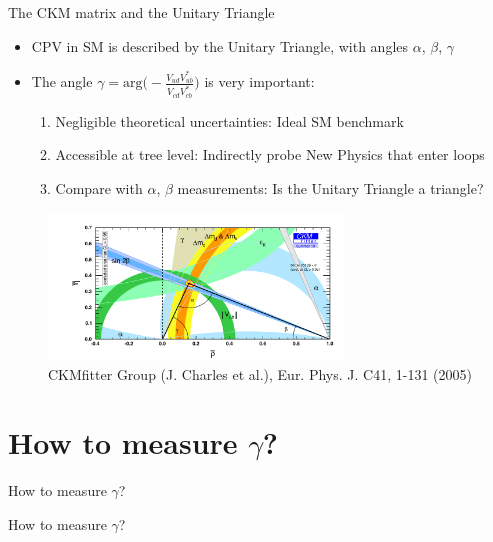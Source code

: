 \documentclass{beamer}
\begin{document}
\begin{frame}{The CKM matrix and the Unitary Triangle}
  \begin{itemize}
    \setlength\itemsep{0.3em}
    \item{CPV in SM is described by the Unitary Triangle, with angles $\alpha$, $\beta$, $\gamma$}
    \item{The angle $\gamma = \text{arg}\Big(-\frac{V^{\phantom{*}}_{ud}V^*_{ub}}{V^{\phantom{*}}_{cd}V^*_{cb}}\Big)$ is very important:}
    \begin{enumerate}
    \setlength\itemsep{0.2em}
      \item{Negligible theoretical uncertainties: Ideal SM benchmark}
      \item{Accessible at tree level: Indirectly probe New Physics that enter loops}
      \item{Compare with $\alpha$, $\beta$ measurements: Is the Unitary Triangle a triangle?}
    \end{enumerate}
  \end{itemize}
  \vspace{-0.2cm}
  \begin{figure}
    \includegraphics[width = 0.70\textwidth]{Plots/ckmfitter2.pdf}
    \vspace{-0.3cm}
    \caption*{\tiny CKMfitter Group (J. Charles et al.), Eur. Phys. J. C41, 1-131 (2005)}
  \end{figure}
\end{frame}

\section{How to measure \texorpdfstring{$\gamma$}{gamma}?}
\begin{frame}{How to measure $\gamma$?}
  \begin{center}
    {\huge How to measure $\gamma$?}
  \end{center}
\end{frame}
\end{document}
